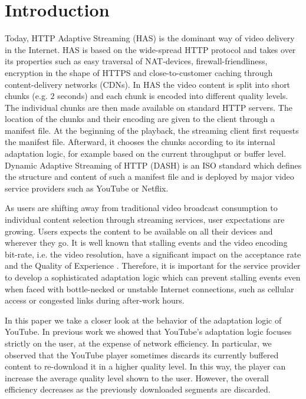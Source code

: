 
\section{Introduction}
\label{sec:introduction}

Today, HTTP Adaptive Streaming (HAS) is the dominant way of video delivery in the Internet. 
HAS is based on the wide-spread HTTP protocol and takes over its properties such as easy traversal of NAT-devices, firewall-friendliness, encryption in the shape of HTTPS and close-to-customer caching through content-delivery networks (CDNs).
In HAS the video content is split into short chunks (e.g. $2$ seconds) and each chunk is encoded into different quality levels.
The individual chunks are then made available on standard HTTP servers.
The location of the chunks and their encoding are given to the client through a manifest file.
At the beginning of the playback, the streaming client first requests the manifest file. 
Afterward, it chooses the chunks according to its internal adaptation logic, for example based on the current throughput or buffer level.
Dynamic Adaptive Streaming of HTTP (DASH) is an ISO standard which defines the structure and content of such a manifest file and is deployed by major video service providers such as YouTube or Netflix.

As users are shifting away from traditional video broadcast consumption to individual content selection through streaming services, user expectations are growing. 
Users expects the content to be available on all their devices and wherever they go. 
It is well known that stalling events and the video encoding bit-rate, i.e. the video resolution, have a significant impact on the acceptance rate and the Quality of Experience \cite{casas2012youtube}.
Therefore, it is important for the service provider to develop a sophisticated adaptation logic which can prevent stalling events even when faced with bottle-necked or unstable Internet connections, such as cellular access or congested links during after-work hours.

In this paper we take a closer look at the behavior of the adaptation logic of YouTube.
In previous work \cite{sieber16sacrificing} we showed that YouTube's adaptation logic focuses strictly on the user, at the expense of network efficiency.
In particular, we observed that the YouTube player sometimes discards its currently buffered content to re-download it in a higher quality level.
In this way, the player can increase the average quality level shown to the user.
However, the overall efficiency decreases as the previously downloaded segments are discarded.

